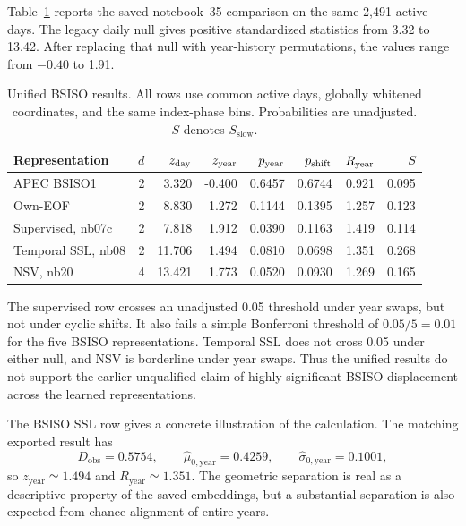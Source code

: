 \documentclass[11pt]{article}
\begin{document}
Table~\ref{tab:bsiso} reports the saved notebook~35 comparison on the same 2,491 active days. The legacy daily null gives positive standardized statistics from 3.32 to 13.42. After replacing that null with year-history permutations, the values range from $-0.40$ to 1.91.

\begin{table}[htbp]
\centering\small
\setlength{\tabcolsep}{4pt}
\caption{Unified BSISO results. All rows use common active days, globally whitened coordinates, and the same index-phase bins. Probabilities are unadjusted. $S$ denotes $S_{\mathrm{slow}}$.}
\label{tab:bsiso}
\begin{tabular}{lrrrrrrr}
\toprule
Representation & $d$ & $z_{\rm day}$ & $z_{\rm year}$ & $p_{\rm year}$ & $p_{\rm shift}$ & $R_{\rm year}$ & $S$\\
\midrule
APEC BSISO1 & 2 & 3.320 & -0.400 & 0.6457 & 0.6744 & 0.921 & 0.095\\
Own-EOF & 2 & 8.830 & 1.272 & 0.1144 & 0.1395 & 1.257 & 0.123\\
Supervised, nb07c & 2 & 7.818 & 1.912 & 0.0390 & 0.1163 & 1.419 & 0.114\\
Temporal SSL, nb08 & 2 & 11.706 & 1.494 & 0.0810 & 0.0698 & 1.351 & 0.268\\
NSV, nb20 & 4 & 13.421 & 1.773 & 0.0520 & 0.0930 & 1.269 & 0.165\\
\bottomrule
\end{tabular}
\end{table}

The supervised row crosses an unadjusted 0.05 threshold under year swaps, but not under cyclic shifts. It also fails a simple Bonferroni threshold of $0.05/5=0.01$ for the five BSISO representations. Temporal SSL does not cross 0.05 under either null, and NSV is borderline under year swaps. Thus the unified results do not support the earlier unqualified claim of highly significant BSISO displacement across the learned representations.

The BSISO SSL row gives a concrete illustration of the calculation. The matching exported result has
\begin{equation}
D_{\mathrm{obs}}=0.5754,\qquad
\widehat\mu_{0,\mathrm{year}}=0.4259,\qquad
\widehat\sigma_{0,\mathrm{year}}=0.1001,
\end{equation}
so $z_{\mathrm{year}}\simeq1.494$ and $R_{\mathrm{year}}\simeq1.351$. The geometric separation is real as a descriptive property of the saved embeddings, but a substantial separation is also expected from chance alignment of entire years.
\end{document}
